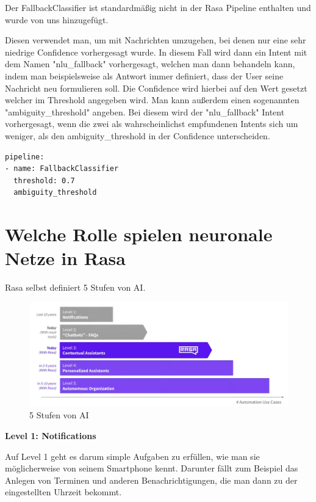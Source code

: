Der FallbackClassifier ist standardmäßig nicht in der Rasa Pipeline enthalten und wurde von uns hinzugefügt.\cite{startingPipelines}

Diesen verwendet man, um mit Nachrichten umzugehen, bei denen nur eine sehr niedrige Confidence vorhergesagt wurde.
In diesem Fall wird dann ein Intent mit dem Namen "nlu\_fallback" vorhergesagt, welchen man dann behandeln kann, indem man beispielsweise als Antwort immer definiert, dass der User seine Nachricht neu formulieren soll.
Die Confidence wird hierbei auf den Wert gesetzt welcher im Threshold angegeben wird.\cite{fallbackClassifier, nluFallback}
Man kann außerdem einen sogenannten "ambiguity\_threshold" angeben.
Bei diesem wird der "nlu\_fallback" Intent vorhergesagt, wenn die zwei als wahrscheinlichst empfundenen Intents sich um weniger, als den ambiguity\_threshold in der Confidence unterscheiden.\cite{fallbackClassifier}

\begin{lstlisting}[label={lst: FallbackClassifier}]
pipeline:
- name: FallbackClassifier
  threshold: 0.7
  ambiguity_threshold
\end{lstlisting}

\section{Welche Rolle spielen neuronale Netze in Rasa}

Rasa selbst definiert 5 Stufen von AI\@.\cite{ai5Levels}

\begin{figure}[hbt!]
  \centering
  \includegraphics[scale=0.25]{pics/5_levels_of_ai}
  \caption{5 Stufen von AI~\cite{ai5LevelsVideo}}
  \label{fig:5_levels_of_ai}
\end{figure}

\textbf{Level 1: Notifications}

Auf Level 1 geht es darum simple Aufgaben zu erfüllen, wie man sie möglicherweise von seinem Smartphone kennt.
Darunter fällt zum Beispiel das Anlegen von Terminen und anderen Benachrichtigungen, die man dann zu der eingestellten Uhrzeit bekommt.\cite{rasaMasterclass5Levels,ai5Levels,ai5LevelsVideo}

